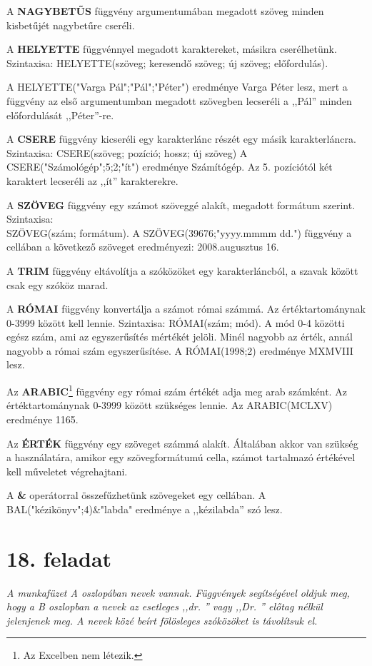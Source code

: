 A \textbf{NAGYBETŰS} függvény argumentumában megadott szöveg minden
kisbetűjét nagybetűre cseréli.

A \textbf{HELYETTE} függvénnyel megadott karaktereket, másikra
cserélhetünk. Szintaxisa: HELYETTE(szöveg; keresendő
szöveg; új szöveg; előfordulás).

A HELYETTE("Varga Pál";"Pál";"Péter")
eredménye Varga Péter lesz, mert a függvény az első
argumentumban megadott szövegben lecseréli a
,,Pál'' minden előfordulását ,,Péter''-re.

A \textbf{CSERE} függvény kicseréli egy karakterlánc
részét egy másik karakterláncra. Szintaxisa: CSERE(szöveg;
pozíció; hossz; új szöveg) A
CSERE("Számológép";5;2;"ít")
eredménye Számítógép. Az 5. pozíciótól két karaktert
lecseréli az ,,ít'' karakterekre.

A \textbf{SZÖVEG} függvény egy számot szöveggé alakít,
megadott formátum szerint. Szintaxisa:\\
SZÖVEG(szám; formátum). A SZÖVEG(39676;"yyyy.mmmm dd.")
függvény a cellában  a következő szöveget eredményezi: 2008.augusztus 16. 

A \textbf{TRIM} függvény eltávolítja a szóközöket egy
karakterláncból, a szavak között csak egy szóköz marad.

A \textbf{RÓMAI} függvény konvertálja a számot római
számmá. Az értéktartománynak 0-3999 között kell lennie.
Szintaxisa: RÓMAI(szám; mód). A mód 0-4 közötti egész
szám, ami az egyszerűsítés  mértékét jelöli. Minél
nagyobb az érték, annál nagyobb a római szám
egyszerűsítése. A RÓMAI(1998;2) eredménye MXMVIII lesz.

Az \textbf{ARABIC}\footnote{Az Excelben nem létezik.} függvény egy római szám értékét adja
meg arab számként. Az értéktartománynak 0-3999 között
szükséges lennie. Az ARABIC(MCLXV) eredménye
1165.

Az \textbf{ÉRTÉK} függvény egy szöveget számmá alakít.
Általában akkor van szükség a használatára, amikor egy
szövegformátumú cella, számot tartalmazó értékével kell
műveletet végrehajtani.  

A \textbf{\&} operátorral összefűzhetünk szövegeket egy
cellában. A
BAL("kézikönyv";4)\&{"labda"}
eredménye a ,,kézilabda''
szó lesz. 


\section{18. feladat}
{\itshape
A munkafüzet A oszlopában nevek vannak. Függvények
segítségével oldjuk meg, hogy a B oszlopban a nevek az esetleges
,,dr. '' vagy ,,Dr. '' előtag nélkül
jelenjenek meg. A nevek közé beírt fölösleges
szóközöket is távolítsuk el.}

